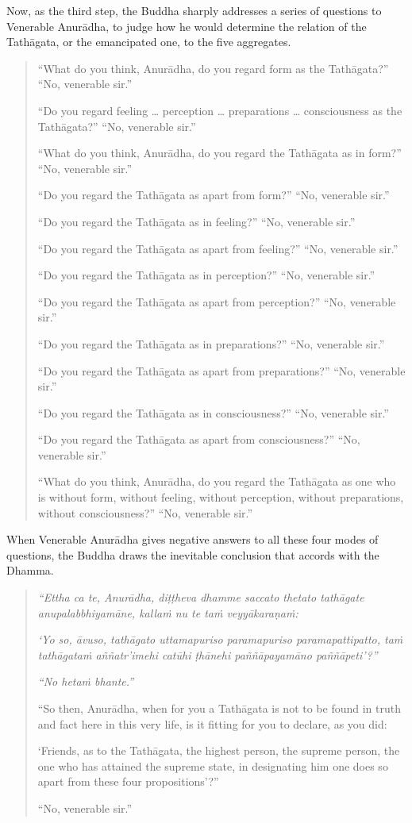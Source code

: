 Now, as the third step, the Buddha sharply addresses a series of questions to Venerable Anurādha, to judge how he would determine the relation of the Tathāgata, or the emancipated one, to the five aggregates.

\begin{quote}
``What do you think, Anurādha, do you regard form as the Tathāgata?'' ``No, venerable sir.''

``Do you regard feeling \ldots{} perception \ldots{} preparations \ldots{} consciousness as the Tathāgata?'' ``No, venerable sir.''

``What do you think, Anurādha, do you regard the Tathāgata as in form?'' ``No, venerable sir.''

``Do you regard the Tathāgata as apart from form?'' ``No, venerable sir.''

``Do you regard the Tathāgata as in feeling?'' ``No, venerable sir.''

``Do you regard the Tathāgata as apart from feeling?'' ``No, venerable sir.''

``Do you regard the Tathāgata as in perception?'' ``No, venerable sir.''

``Do you regard the Tathāgata as apart from perception?'' ``No, venerable sir.''

``Do you regard the Tathāgata as in preparations?'' ``No, venerable sir.''

``Do you regard the Tathāgata as apart from preparations?'' ``No, venerable sir.''

``Do you regard the Tathāgata as in consciousness?'' ``No, venerable sir.''

``Do you regard the Tathāgata as apart from consciousness?'' ``No, venerable sir.''

``What do you think, Anurādha, do you regard the Tathāgata as one who is without form, without feeling, without perception, without preparations, without consciousness?'' ``No, venerable sir.''
\end{quote}

When Venerable Anurādha gives negative answers to all these four modes of questions, the Buddha draws the inevitable conclusion that accords with the Dhamma.

\enlargethispage{\baselineskip}

\begin{quote}
\emph{``Ettha ca te, Anurādha, diṭṭheva dhamme saccato thetato tathāgate anupalabbhiyamāne, kallaṁ nu te taṁ veyyākaraṇaṁ:}

\emph{`Yo so, āvuso, tathāgato uttamapuriso paramapuriso paramapattipatto, taṁ tathāgataṁ aññatr'imehi catūhi ṭhānehi paññāpayamāno paññāpeti'?''}

\emph{``No hetaṁ bhante.''}

``So then, Anurādha, when for you a Tathāgata is not to be found in truth and fact here in this very life, is it fitting for you to declare, as you did:

`Friends, as to the Tathāgata, the highest person, the supreme person, the one who has attained the supreme state, in designating him one does so apart from these four propositions'?''

``No, venerable sir.''
\end{quote}

